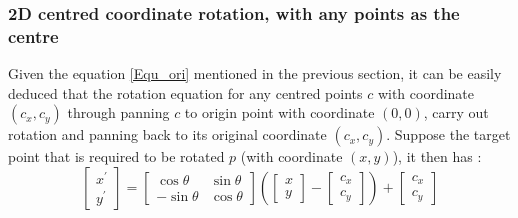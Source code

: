 \subsubsection{2D centred coordinate rotation, with any points as the centre}
Given the equation \ref{Equ_ori} mentioned in the previous section, it can be easily
deduced that the rotation equation for any centred points $c$ with coordinate $(c_{x}, c_{y})$ through
panning $c$ to origin point with coordinate $(0, 0)$, carry out rotation and panning back to its original coordinate $(c_{x}, c_{y})$.
Suppose the target point that is required to be rotated $p$ (with coordinate $(x, y)$), it then has :
\begin{equation} \label{Equ_anycen}
  \begin{bmatrix}
   x^{'} \\ y^{'}
   \end{bmatrix} =   \begin{bmatrix}
      \cos\theta & \sin\theta \\
      -\sin\theta & \cos\theta
    \end{bmatrix} \left(\begin{bmatrix}
      x \\ y
     \end{bmatrix} - \begin{bmatrix}
       c_{x} \\ c_{y}
     \end{bmatrix}\right) + \begin{bmatrix}
        c_{x} \\ c_{y}
       \end{bmatrix}
\end{equation}

